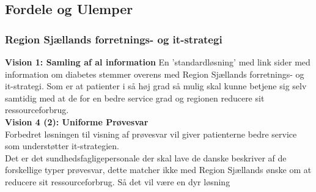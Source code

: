 %
%
%
\subsection{Fordele og Ulemper}
\subsubsection{Region Sjællands forretnings- og it-strategi}
%
\textbf{Vision 1: Samling af al information}
En 'standardløsning' med link sider med information om diabetes stemmer overens med Region Sjællands forretnings- og it-strategi. 
Som er at patienter i så høj grad så mulig skal kunne betjene sig selv samtidig med at de for en bedre service grad og regionen reducere sit ressourceforbrug.\\
%
\textbf{Vision 4 (2): Uniforme Prøvesvar}\\
Forbedret løsningen til visning af prøvesvar vil giver patienterne bedre service som understøtter it-strategien.\\
Det er det sundhedsfagligepersonale der skal lave de danske beskriver af de forskellige typer prøvesvar, dette matcher ikke med Region Sjællands ønske om at reducere sit ressourceforbrug. Så det vil være en dyr løsning\\
